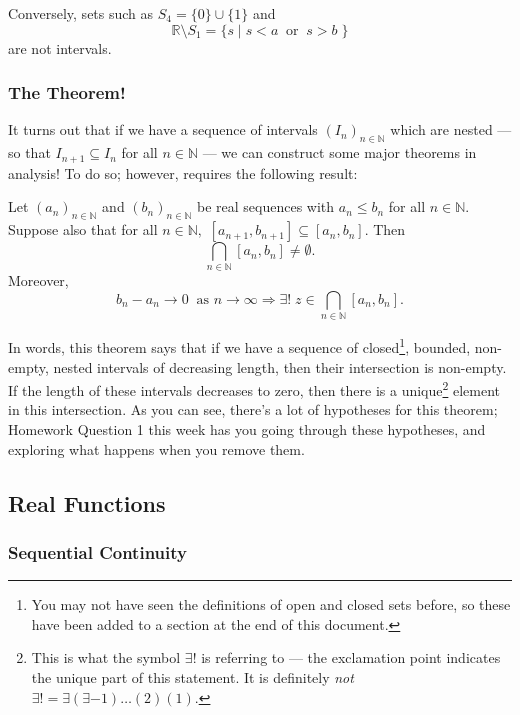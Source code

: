 \documentclass[
  10pt,
  a4paper]{article}
\theoremstyle{plain}
\theoremstyle{plain}
\theoremstyle{plain}
\theoremstyle{plain}
\theoremstyle{plain}
\theoremstyle{definition}
\theoremstyle{definition}
\theoremstyle{definition}
\theoremstyle{remark}
\let\BeginKnitrBlock\begin \let\EndKnitrBlock\end
\begin{document}
Conversely, sets such as \(S_4 = \lbrace 0 \rbrace \cup \lbrace 1 \rbrace\) and \[\mathbb{R}\setminus S_1 = \lbrace s \;\lvert\; s < a \;\; \text{or}\;\; s > b\;\rbrace\] are not intervals.

\hypertarget{the-theorem}{%
\subsubsection{The Theorem!}\label{the-theorem}}

It turns out that if we have a sequence of intervals \((I_n)_{n\in\mathbb{N}}\) which are nested --- so that \(I_{n+1} \subseteq I_n\) for all \(n\in\mathbb{N}\) --- we can construct some major theorems in analysis! To do so; however, requires the following result:

\BeginKnitrBlock{theorem}[Nested Intervals Theorem]
{\label{thm:thm1} }Let \((a_n)_{n\in\mathbb{N}}\) and \((b_n)_{n\in\mathbb{N}}\) be real sequences with \(a_n \leq b_n\) for all \(n\in\mathbb{N}\). Suppose also that for all \(n\in\mathbb{N},\) \([a_{n+1},b_{n+1}] \subseteq [a_{n},b_{n}]\). Then \[\bigcap_{n\in\mathbb{N}}[a_n,b_n] \neq \emptyset.\] Moreover, \[b_n - a_n \to 0 \;\;\text{as $n \to \infty$} \Longrightarrow \exists!\; z \in \bigcap_{n\in\mathbb{N}}[a_n,b_n].\]
\EndKnitrBlock{theorem}
In words, this theorem says that if we have a sequence of closed\footnote{You may not have seen the definitions of open and closed sets before, so these have been added to a section at the end of this document.}, bounded, non-empty, nested intervals of decreasing length, then their intersection is non-empty. If the length of these intervals decreases to zero, then there is a unique\footnote{This is what the symbol \(\exists!\) is referring to --- the exclamation point indicates the unique part of this statement. It is definitely \emph{not} \(\exists! = \exists(\exists-1)\ldots(2)(1).\)} element in this intersection. As you can see, there's a lot of hypotheses for this theorem; Homework Question 1 this week has you going through these hypotheses, and exploring what happens when you remove them.

\hypertarget{sec1}{%
\subsection{Real Functions}\label{sec1}}

\hypertarget{sequential-continuity}{%
\subsubsection{Sequential Continuity}\label{sequential-continuity}}
\end{document}
